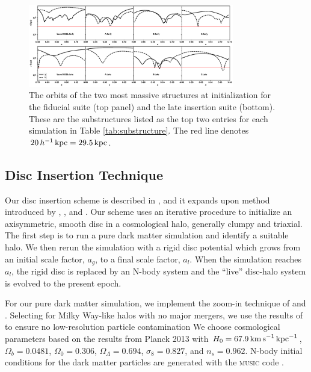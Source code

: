 \begin{figure}
	\centering
	\includegraphics[width=0.8\textwidth]{../figures/substructure_r_vs_t.eps}
	\caption{The orbits of the two most massive structures at initialization for the fiducial suite (top panel) and the late insertion suite (bottom). These are the substructures listed as the top two entries for each simulation in Table \ref{tab:substructure}. The red line denotes $20\, h^{-1} \, \text{kpc} = 29.5 \, \text{kpc}$. } \label{fig:substructure_orbits}
\end{figure}

\subsection{Disc Insertion Technique} \label{ssec:disc_insertio}

Our disc insertion scheme is described in \citet{bauer2018a}, and
it expands upon method introduced by
\citet{BerentzenShlosmanStellarDisks}, \citet{debuhr_2012}, and
\citet{ys_2015}. Our scheme uses an iterative procedure to
initialize an axisymmetric, smooth disc in a cosmological halo, generally clumpy and triaxial. 
The first step is to run a pure dark matter
simulation and identify a suitable halo.  We then rerun the simulation with a rigid disc potential which 
grows from an initial scale factor, $a_g$, to a final scale factor, $a_l$.
When the simulation reaches $a_l$,
the rigid disc is replaced by an N-body system and the ``live'' disc-halo
system is evolved to the present epoch. 

For our pure dark matter simulation, we implement the zoom-in
technique of \citet{KatzQuasarZoom} and \citet{NavarroWhiteZoom}.
Selecting for Milky Way-like halos with no major mergers, we use the
results of \cite{onorbe_etal_2014} to ensure no low-resolution particle contamination 
We choose cosmological parameters based on the results
from Planck 2013 \citep{planck_2014} with $H_0=67.9\,{\rm
  km\,s}^{-1}\,{\rm kpc}^{-1}$, $\Omega_b = 0.0481$, $\Omega_0 =
0.306$, $\Omega_\Lambda = 0.694$, $\sigma_8 = 0.827$, and $n_s =
0.962$.  N-body initial conditions for the dark matter particles are
generated with the \textsc{music} code \citep{music}.  

